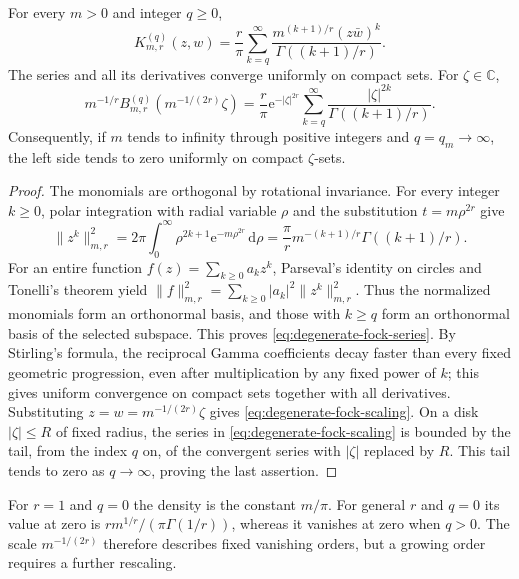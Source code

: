 \begin{proposition}\label{prop:degenerate-fock-kernel}
For every $m>0$ and integer $q\geq0$,
\begin{equation}\label{eq:degenerate-fock-series}
 K_{m,r}^{(q)}(z,w)=\frac r\pi\sum_{k=q}^\infty
 \frac{m^{(k+1)/r}(z\bar w)^k}{\Gamma((k+1)/r)}.
\end{equation}
The series and all its derivatives converge uniformly on compact sets. For $\zeta\in\mathbb C$,
\begin{equation}\label{eq:degenerate-fock-scaling}
 m^{-1/r}B_{m,r}^{(q)}(m^{-1/(2r)}\zeta)
 =\frac r\pi\mathrm{e}^{-|\zeta|^{2r}}
       \sum_{k=q}^\infty\frac{|\zeta|^{2k}}{\Gamma((k+1)/r)}.
\end{equation}
Consequently, if $m$ tends to infinity through positive integers and $q=q_m\to\infty$, the left side tends to zero uniformly on compact $\zeta$-sets.
\end{proposition}
\begin{proof}
The monomials are orthogonal by rotational invariance. For every integer $k\geq0$, polar integration with radial variable $\rho$ and the substitution $t=m\rho^{2r}$ give
\[
 \|z^k\|_{m,r}^2=2\pi\int_0^\infty\rho^{2k+1}\mathrm{e}^{-m\rho^{2r}}\,\mathrm{d}\rho
 =\frac\pi r m^{-(k+1)/r}\Gamma((k+1)/r).
\]
For an entire function $f(z)=\sum_{k\geq0}a_kz^k$, Parseval's identity on circles and Tonelli's theorem yield
$\|f\|_{m,r}^2=\sum_{k\geq0}|a_k|^2\|z^k\|_{m,r}^2$.
Thus the normalized monomials form an orthonormal basis, and those with $k\geq q$ form an orthonormal basis of the selected subspace. This proves \eqref{eq:degenerate-fock-series}. By Stirling's formula, the reciprocal Gamma coefficients decay faster than every fixed geometric progression, even after multiplication by any fixed power of $k$; this gives uniform convergence on compact sets together with all derivatives. Substituting $z=w=m^{-1/(2r)}\zeta$ gives \eqref{eq:degenerate-fock-scaling}. On a disk $|\zeta|\leq R$ of fixed radius, the series in \eqref{eq:degenerate-fock-scaling} is bounded by the tail, from the index $q$ on, of the convergent series with $|\zeta|$ replaced by $R$. This tail tends to zero as $q\to\infty$, proving the last assertion.
\end{proof}

For $r=1$ and $q=0$ the density is the constant $m/\pi$. For general $r$ and $q=0$ its value at zero is $rm^{1/r}/(\pi\Gamma(1/r))$, whereas it vanishes at zero when $q>0$. The scale $m^{-1/(2r)}$ therefore describes fixed vanishing orders, but a growing order requires a further rescaling.

